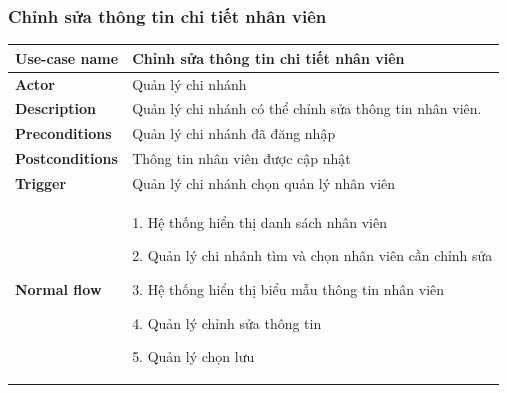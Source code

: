         \subsubsection{Chỉnh sửa thông tin chi tiết nhân viên}
            \begin{longtable}{| p{} | p{} |} 
                \hline
                    \textbf{Use-case name} 
                & 
                    Chỉnh sửa thông tin chi tiết nhân viên
                \\
                \hline
                    \textbf{Actor} 
                & 
                    Quản lý chi nhánh
                \\
                \hline
                    \textbf{Description} 
                & 
                    Quản lý chi nhánh có thể chỉnh sửa thông tin nhân viên.
                \\
                \hline
                    \textbf{Preconditions} 
                &
                    Quản lý chi nhánh đã đăng nhập
                \\
                \hline
                    \textbf{Postconditions} 
                & 
                    Thông tin nhân viên được cập nhật
                \\
                \hline
                    \textbf{Trigger} 
                & 
                    Quản lý chi nhánh chọn quản lý nhân viên
                \\
                \hline
                \begin{flushleft}
                    \textbf{Normal flow}
                \end{flushleft}
                & 
                1. Hệ thống hiển thị danh sách  nhân viên
                    
                    2. Quản lý chi nhánh tìm và chọn nhân viên cần chỉnh sửa
                    
                    3. Hệ thống hiển thị biểu mẫu thông tin nhân viên
                    
                    4. Quản lý chỉnh sửa thông tin
                    
                    5. Quản lý chọn lưu
                    

\end{longtable}
